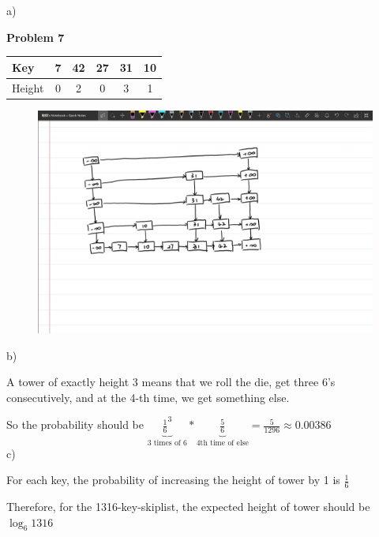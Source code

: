 \documentclass[12pt]{article}
\begin{document}
	
	a)
	
	\begin{center}
		{\Large\bf Problem 7}\\
		\vspace{3mm}
	\end{center}
	
	\def\question#1{\item[\bf #1.]}
	\def\part#1{\item[\bf #1)]}
	\newcommand{\pc}[1]{\mbox{\textbf{#1}}} %
	
	
	
	
	\begin{tabular}{ | l || c  | c | c | c | c |} \hline
		Key & 7 & 42 & 27 & 31 & 10  \\ \hline
		Height & 0 & 2 & 0  & 3 & 1 \\ \hline
	\end{tabular}
	\begin{figure}[tbhp]
		\begin{center}
			\includegraphics[width=1\textwidth]{7.jpg}
		\end{center}
	\end{figure}
	
	
	b)
	
	A tower of exactly height 3 means that we roll the die, get three 6's consecutively, and at the 4-th time, we get something else.
	
	So the probability should be $\underbrace{\frac{1}{6}^3}_{\text{3 times of 6}} * \underbrace{\frac{5}{6}}_{\text{4th time of else}} = \frac{5}{1296} \approx 0.00386$\\
	
	
	c)
	
	For each key, the probability of increasing the height of tower by 1 is $\frac{1}{6}$
	
	Therefore, for the 1316-key-skiplist, the expected height of tower should be $\log_6 1316$
	
\end{document}
